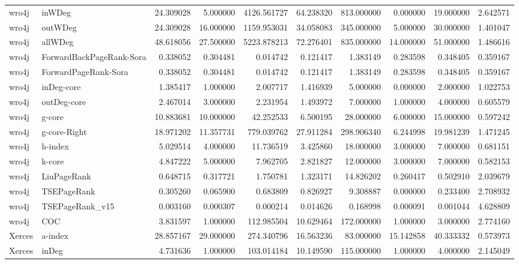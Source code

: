 \begin{tabular}{llrrrrrrrr}
wro4j & inWDeg & 24.309028 & 5.000000 & 4126.561727 & 64.238320 & 813.000000 & 0.000000 & 19.000000 & 2.642571 \\
wro4j & outWDeg & 24.309028 & 16.000000 & 1159.953031 & 34.058083 & 345.000000 & 5.000000 & 30.000000 & 1.401047 \\
wro4j & allWDeg & 48.618056 & 27.500000 & 5223.878213 & 72.276401 & 835.000000 & 14.000000 & 51.000000 & 1.486616 \\
wro4j & ForwardBackPageRank-Sora & 0.338052 & 0.304481 & 0.014742 & 0.121417 & 1.383149 & 0.283598 & 0.348405 & 0.359167 \\
wro4j & ForwardPageRank-Sora & 0.338052 & 0.304481 & 0.014742 & 0.121417 & 1.383149 & 0.283598 & 0.348405 & 0.359167 \\
wro4j & inDeg-core & 1.385417 & 1.000000 & 2.007717 & 1.416939 & 5.000000 & 0.000000 & 2.000000 & 1.022753 \\
wro4j & outDeg-core & 2.467014 & 3.000000 & 2.231954 & 1.493972 & 7.000000 & 1.000000 & 4.000000 & 0.605579 \\
wro4j & g-core & 10.883681 & 10.000000 & 42.252533 & 6.500195 & 28.000000 & 6.000000 & 15.000000 & 0.597242 \\
wro4j & g-core-Right & 18.971202 & 11.357731 & 779.039762 & 27.911284 & 298.906340 & 6.244998 & 19.981239 & 1.471245 \\
wro4j & h-index & 5.029514 & 4.000000 & 11.736519 & 3.425860 & 18.000000 & 3.000000 & 7.000000 & 0.681151 \\
wro4j & k-core & 4.847222 & 5.000000 & 7.962705 & 2.821827 & 12.000000 & 3.000000 & 7.000000 & 0.582153 \\
wro4j & LiuPageRank & 0.648715 & 0.317721 & 1.750781 & 1.323171 & 14.826202 & 0.260417 & 0.502910 & 2.039679 \\
wro4j & TSEPageRank & 0.305260 & 0.065900 & 0.683809 & 0.826927 & 9.308887 & 0.000000 & 0.233400 & 2.708932 \\
wro4j & TSEPageRank_v15 & 0.003160 & 0.000307 & 0.000214 & 0.014626 & 0.168998 & 0.000091 & 0.001044 & 4.628809 \\
wro4j & COC & 3.831597 & 1.000000 & 112.985504 & 10.629464 & 172.000000 & 1.000000 & 3.000000 & 2.774160 \\
Xerces & a-index & 28.857167 & 29.000000 & 274.340796 & 16.563236 & 83.000000 & 15.142858 & 40.333332 & 0.573973 \\
Xerces & inDeg & 4.731636 & 1.000000 & 103.014184 & 10.149590 & 115.000000 & 1.000000 & 4.000000 & 2.145049 \\

\end{tabular}
